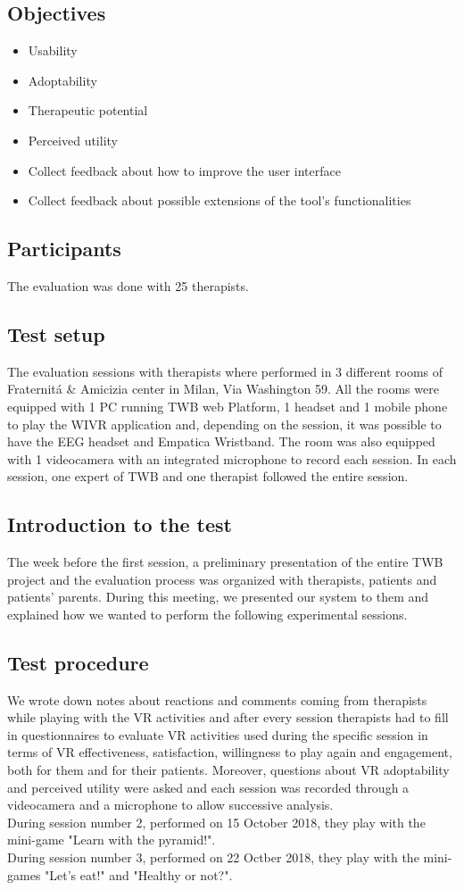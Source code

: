 \subsection{Objectives}
\begin{itemize}
\item Usability
\item Adoptability
\item Therapeutic potential
\item Perceived utility
\item Collect feedback about how to improve the user interface
\item Collect feedback about possible extensions of the tool's functionalities
\end{itemize}
\subsection{Participants}
The evaluation was done with 25 therapists.
\subsection{Test setup}
The evaluation sessions with therapists where performed in 3 different rooms of Fraternit\'a \& Amicizia center in Milan, Via Washington 59. All the rooms were equipped with 1 PC running TWB web Platform, 1 headset and 1 mobile phone to play the WIVR application and, depending on the session, it was possible to have the EEG headset and Empatica Wristband. The room was also equipped with 1 videocamera with an integrated microphone to record each session. In each session, one expert of TWB and one therapist followed the entire session.
\subsection{Introduction to the test}
The week before the first session, a preliminary presentation of the entire TWB project and the evaluation process was organized with therapists, patients and patients' parents. During this meeting, we presented our system to them and explained how we wanted to perform the following experimental sessions.
\subsection{Test procedure}
We wrote down notes about reactions and comments coming from therapists while playing with the VR activities and after every session therapists had to fill in questionnaires to evaluate VR activities used during the specific session in terms of VR effectiveness, satisfaction, willingness to play again and engagement, both for them and for their patients. Moreover, questions about VR adoptability and perceived utility were asked and each session was recorded through a videocamera and a microphone to allow successive analysis.\\
During session number 2, performed on 15 October 2018, they play with the mini-game "Learn with the pyramid!".\\
During session number 3, performed on 22 Octber 2018, they play with the mini-games "Let's eat!" and "Healthy or not?".
